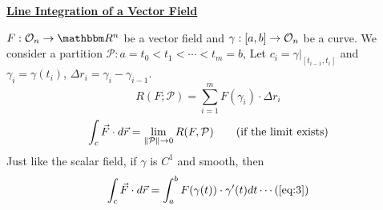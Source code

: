 \documentclass[Analysis-3]{subfiles}
\begin{document}
\begin{center}
    \large \underline{\textbf{Line Integration of a Vector Field} }
\end{center}

$F:\Op{n} \to \R^n$ be a vector field and $\gamma:[a,b] \to \mathcal{O}_{n}$ be a curve. We consider a partition $\mathcal{P}: a =t_0<t_1<\cdots < t_m=b$, Let $c_i = \gamma|_{[t_{i-1},t_i]}$ and $\gamma_i = \gamma(t_i)$, $\Delta r_i = \gamma_{i} - \gamma_{i-1}$.
\[R(F;\mathcal{P})= \sum_{i=1}^m F(\gamma_i)\cdot \Delta r_i\]
\begin{align*}
    \int_c \vec{F}\cdot d\vec{r} = \lim_{\norm{\mathcal{P}}\to 0} R(F,\mathcal{P}) \tag{if the limit exists}
\end{align*}
Just like the scalar field, if $\gamma$ is $C^1$ and smooth, then
\[\int_c \vec{F}\cdot d\vec{r} = \int_a^b F(\gamma(t))\cdot \gamma'(t) dt \label{eq:3} \cdots (\ref{eq:3})\]
\end{document}
